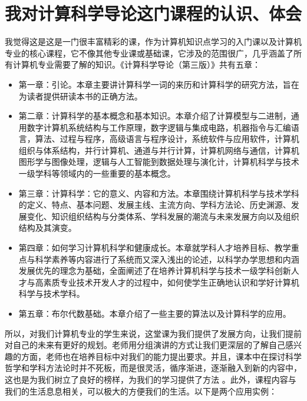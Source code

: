 \documentclass{article}
\begin{document}
\section{我对计算科学导论这门课程的认识、体会}
我觉得这是这是一门很丰富精彩的课，作为计算机知识点学习的入门课以及计算机专业的核心课程，它不像其他专业课或基础课，它涉及的范围很广，几乎涵盖了所有计算机专业需要了解的知识。《计算科学导论（第三版）》\citep{赵致琢2004计算科学导论}共有五章：\par
\begin{itemize}
\item 第一章：引论。本章主要讲计算科学一词的来历和计算科学的研究方法，旨在为读者提供研读本书的正确方法。
\item 第二章：计算科学的基本概念和基本知识。本章介绍了计算模型与二进制，通用数字计算机系统结构与工作原理，数字逻辑与集成电路，机器指令与汇编语言，算法、过程与程序，高级语言与程序设计，系统软件与应用软件，计算机组织与体系结构，并行计算机、通道与并行计算，计算机网络与通信，计算机图形学与图像处理，逻辑与人工智能到数据处理与演化计，计算机科学与技术一级学科等领域内的一些重要的基本概念。
\item 第三章：计算科学：它的意义、内容和方法。本章围绕计算机科学与技术学科的定义、特点、基本问题、发展主线、主流方向、学科方法论、历史渊源、发展变化、知识组织结构与分类体系、学科发展的潮流与未来发展方向以及组织结构及其演变。
\item 第四章：如何学习计算机科学和健康成长。本章就学科人才培养目标、教学重点与科学素养等内容进行了系统而又深入浅出的论述，以科学办学思想和内涵发展优先的理念为基础，全面阐述了在培养计算机科学与技术一级学科创新人才与高素质专业技术开发人才的过程中，如何使学生正确地认识和学好计算机科学与技术学科。
\item 第五章：布尔代数基础。本章介绍了一些主要的算法以及计算科学的应用。
\end{itemize}
\par
		所以，对我们计算机专业的学生来说，这堂课为我们提供了发展方向，让我们提前对自己的未来有更好的规划。老师用分组演讲的方式让我们更深层的了解自己感兴趣的方面，老师也在培养目标中对我们的能力提出要求。并且，课本中在探讨科学哲学和学科方法论时并不死板，而是很灵活，循序渐进，逐渐融入到新的内容中，这也是为我们树立了良好的榜样，为我们的学习提供了方法 。此外，课程内容与我们的生活息息相关，可以极大的方便我们的生活。以下是两个应用实例：
\end{document}
